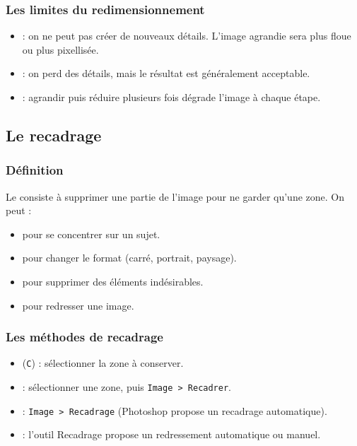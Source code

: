 \subsubsection{Les limites du redimensionnement}

\begin{itemize}
    \item {} : on ne peut pas créer de nouveaux détails. L'image agrandie sera plus floue ou plus pixellisée.
    \item {} : on perd des détails, mais le résultat est généralement acceptable.
    \item {} : agrandir puis réduire plusieurs fois dégrade l'image à chaque étape.
\end{itemize}

\subsection{Le recadrage}

\subsubsection{Définition}

Le  consiste à supprimer une partie de l'image pour ne garder qu'une zone. On peut :

\begin{itemize}
    \item {} pour se concentrer sur un sujet.
    \item {} pour changer le format (carré, portrait, paysage).
    \item {} pour supprimer des éléments indésirables.
    \item {} pour redresser une image.
\end{itemize}

\subsubsection{Les méthodes de recadrage}

\begin{itemize}
    \item {} (\texttt{C}) : sélectionner la zone à conserver.
    \item {} : sélectionner une zone, puis \texttt{Image > Recadrer}.
    \item {} : \texttt{Image > Recadrage} (Photoshop propose un recadrage automatique).
    \item {} : l'outil Recadrage propose un redressement automatique ou manuel.
\end{itemize}

